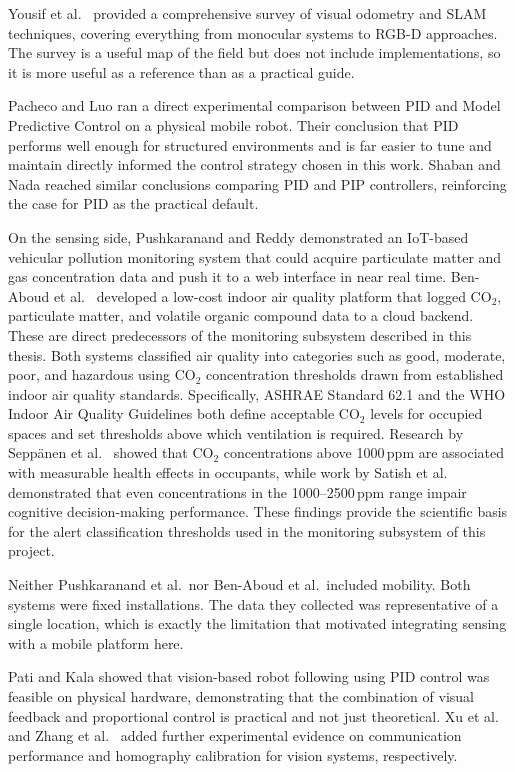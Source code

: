 Yousif et al.\ \cite{r17} provided a comprehensive survey of visual
odometry and SLAM techniques, covering everything from monocular
systems to RGB-D approaches. The survey is a useful map of the field
but does not include implementations, so it is more useful as a
reference than as a practical guide.

Pacheco and Luo \cite{r10} ran a direct experimental comparison
between PID and Model Predictive Control on a physical mobile robot.
Their conclusion that PID performs well enough for structured
environments and is far easier to tune and maintain directly
informed the control strategy chosen in this work. Shaban and Nada
\cite{r9} reached similar conclusions comparing PID and PIP controllers,
reinforcing the case for PID as the practical default.

On the sensing side, Pushkaranand and Reddy \cite{r1} demonstrated an
IoT-based vehicular pollution monitoring system that could acquire
particulate matter and gas concentration data and push it to a web
interface in near real time. Ben-Aboud et al.\ \cite{r2} developed a
low-cost indoor air quality platform that logged CO$_2$, particulate
matter, and volatile organic compound data to a cloud backend. These
are direct predecessors of the monitoring subsystem described in
this thesis. Both systems classified air quality into categories
such as good, moderate, poor, and hazardous using CO$_2$ concentration
thresholds drawn from established indoor air quality standards.
Specifically, ASHRAE Standard 62.1 \cite{r46} and the WHO Indoor Air
Quality Guidelines \cite{r47} both define acceptable CO$_2$ levels for
occupied spaces and set thresholds above which ventilation is required.
Research by Sepp\"{a}nen et al.\ \cite{r48} showed that CO$_2$
concentrations above 1000\,ppm are associated with measurable health
effects in occupants, while work by Satish et al.\ \cite{r49}
demonstrated that even concentrations in the 1000--2500\,ppm range
impair cognitive decision-making performance. These findings provide
the scientific basis for the alert classification thresholds used in
the monitoring subsystem of this project.

Neither Pushkaranand et al.\ nor Ben-Aboud et al.\ included mobility.
Both systems were fixed installations. The data they collected was
representative of a single location, which is exactly the limitation
that motivated integrating sensing with a mobile platform here.

Pati and Kala \cite{r18} showed that vision-based robot following using
PID control was feasible on physical hardware, demonstrating that the
combination of visual feedback and proportional control is practical
and not just theoretical. Xu et al.\ \cite{r19} and Zhang et al.\
\cite{r20} added further experimental evidence on communication
performance and homography calibration for vision systems, respectively.

